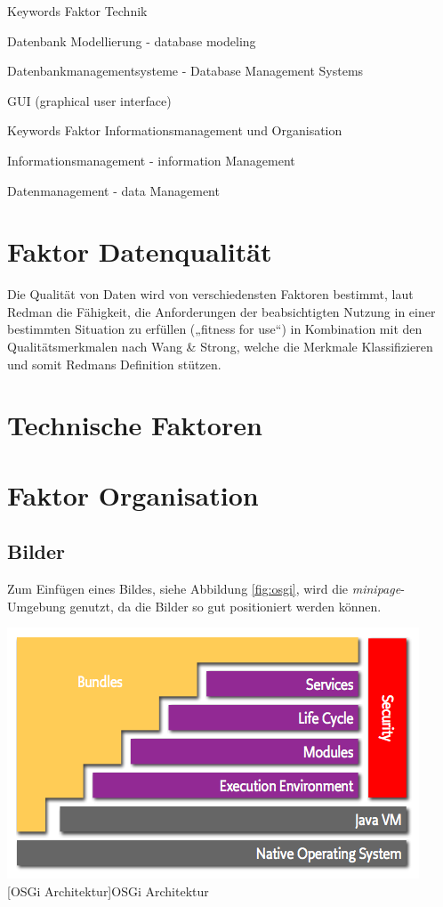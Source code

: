 \documentclass[12pt,a4paper,bibliography=totocnumbered,listof=totocnumbered]{scrartcl}
\begin{document}
Keywords Faktor Technik
\begin{compactitem}
	\item Datenbank Modellierung - database modeling
	\item Datenbankmanagementsysteme - Database Management Systems
	\item GUI (graphical user interface)
\end{compactitem}

Keywords Faktor Informationsmanagement und Organisation
\begin{compactitem}
	\item Informationsmanagement - information Management 
	\item Datenmanagement - data Management
\end{compactitem}





\section{Faktor Datenqualität}
Die Qualität von Daten wird von verschiedensten Faktoren bestimmt,  laut Redman die Fähigkeit, die Anforderungen der beabsichtigten
Nutzung in einer bestimmten Situation zu erfüllen („fitness for use“) \cite{redman} in Kombination mit den Qualitätsmerkmalen nach Wang & Strong, welche die Merkmale Klassifizieren und somit Redmans Definition stützen. 

\section{Technische Faktoren}
\section{Faktor Organisation}

\subsection{Bilder}
Zum Einfügen eines Bildes, siehe Abbildung \ref{fig:osgi}, wird die \textit{minipage}-Umgebung genutzt, da die Bilder so gut positioniert werden können.

\vspace{1em}
\begin{minipage}{\linewidth}
	\centering
	\includegraphics[width=0.7\linewidth]{Bilder/layering-osgi.png}
	[OSGi Architektur]{OSGi Architektur\footnotemark }
	\label{fig:osgi}
\end{minipage}
\end{document}
